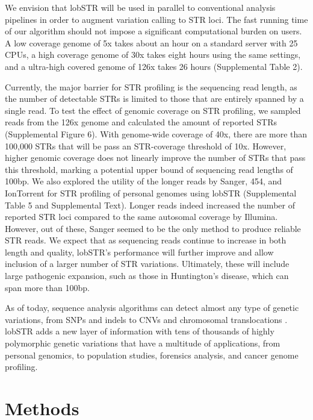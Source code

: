 We envision that lobSTR will be used in parallel to conventional analysis pipelines in order to augment variation calling to STR loci. The fast running time of our algorithm should not impose a significant computational burden on users. A low coverage genome of 5x takes about an hour on a standard server with 25 CPUs, a high coverage genome of 30x takes eight hours using the same settings, and a ultra-high covered genome of 126x takes 26 hours (Supplemental Table 2).

Currently, the major barrier for STR profiling is the sequencing read length, as the number of detectable STRs is limited to those that are entirely spanned by a single read. To test the effect of genomic coverage on STR profiling, we sampled reads from the 126x genome and calculated the amount of reported STRs (Supplemental Figure 6). With genome-wide coverage of 40x, there are more than 100,000 STRs that will be pass an STR-coverage threshold of 10x. However, higher genomic coverage does not linearly improve the number of STRs that pass this threshold, marking a potential upper bound of sequencing read lengths of 100bp. We also explored the utility of the longer reads by Sanger, 454, and IonTorrent for STR profiling of personal genomes using lobSTR (Supplemental Table 5 and Supplemental Text). Longer reads indeed increased the number of reported STR loci compared to the same autosomal coverage by Illumina. However, out of these, Sanger seemed to be the only method to produce reliable STR reads. We expect that as sequencing reads continue to increase in both length and quality, lobSTR’s performance will further improve and allow inclusion of a larger number of STR variations. Ultimately, these will include large pathogenic expansion, such as those in Huntington’s disease, which can span more than 100bp. 

As of today, sequence analysis algorithms can detect almost any type of genetic variations, from SNPs \cite{GoyaSunMorinEtAl2010} and indels \cite{KoboldtChenWylieEtAl2009,GoyaSunMorinEtAl2010} to CNVs and chromosomal translocations \cite{ChenWallisMcLellanEtAl2009}. lobSTR adds a new layer of information with tens of thousands of highly polymorphic genetic variations that have a multitude of applications, from personal genomics, to population studies, forensics analysis, and cancer genome profiling.

\section{Methods}
